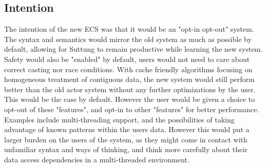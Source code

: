 \subsection{Intention}
\label{subsec:high_level_intention}
The intention of the new ECS was that it would be an "opt-in opt-out" system.
The syntax and semantics would mirror the old system as much as possible by default,
allowing for Suttung to remain productive while learning the new system.
Safety would also be "enabled" by default, users would not need to care about correct casting
nor race conditions.
With cache friendly algorithms focusing on homogeneous treatment of contiguous data,
the new system would still perform better than the old actor system without any further optimizations by the user.
This would be the case by default. However the user would be given a choice to opt-out of these "features",
and opt-in to other "features" for better performance.
Examples include multi-threading support, and the possibilities of taking advantage of known patterns within the users data.
However this would put a larger burden on the users of the system, as they might come in contact with unfamiliar syntax and ways of thinking,
and think more carefully about their data access dependencies in a multi-threaded environment.

